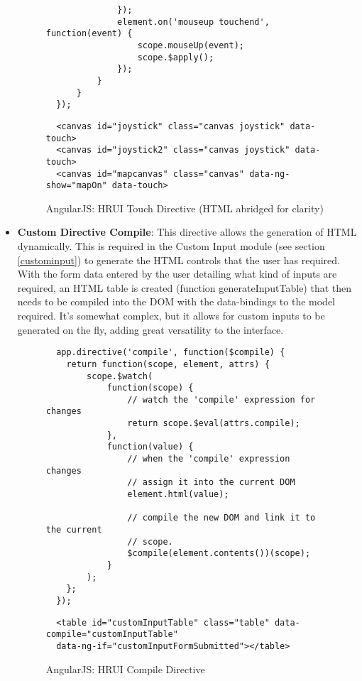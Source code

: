 \begin{itemize}
\begin{figure}[H]
\begin{verbatim}
              });
              element.on('mouseup touchend', function(event) {
                  scope.mouseUp(event);
                  scope.$apply();
              });
          }
      }
  });
  \end{verbatim}
  \end{figure}
  \begin{figure}[H]
  \centering
  \captionsetup{justification=centering}
  \begin{verbatim}
  <canvas id="joystick" class="canvas joystick" data-touch>
  <canvas id="joystick2" class="canvas joystick" data-touch>
  <canvas id="mapcanvas" class="canvas" data-ng-show="mapOn" data-touch>
  \end{verbatim}
  \caption{AngularJS: HRUI Touch Directive (HTML abridged for clarity)}
  \end{figure}
  \item \textbf{Custom Directive Compile}: This directive allows the generation of HTML dynamically. This is required in the Custom 
  Input module (see section \ref{custominput}) to generate the HTML controls that the user has required. With the form data entered by 
  the user detailing what kind of inputs are required, an HTML table is created (function generateInputTable) that then needs to be 
  compiled into the DOM with the data-bindings to the model required. It's somewhat complex, but it allows for custom inputs to be 
  generated on the fly, adding great versatility to the interface.
    \begin{figure}[H]
  \centering
  \captionsetup{justification=centering}
  \begin{verbatim}
  app.directive('compile', function($compile) {
    return function(scope, element, attrs) {
        scope.$watch(
            function(scope) {
                // watch the 'compile' expression for changes
                return scope.$eval(attrs.compile);
            },
            function(value) {
                // when the 'compile' expression changes
                // assign it into the current DOM
                element.html(value);

                // compile the new DOM and link it to the current
                // scope.
                $compile(element.contents())(scope);
            }
        );
    };
  });
  \end{verbatim}
  \end{figure}
  \begin{figure}[H]
  \centering
  \captionsetup{justification=centering}
  \begin{verbatim}
  <table id="customInputTable" class="table" data-compile="customInputTable" 
  data-ng-if="customInputFormSubmitted"></table>
  \end{verbatim}
  \caption{AngularJS: HRUI Compile Directive}
  \end{figure}
\end{itemize}
